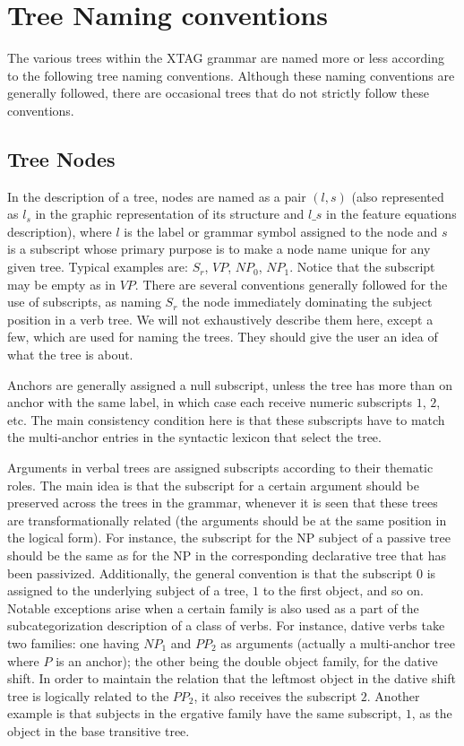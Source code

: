 \chapter{Tree Naming conventions} 
\label{tree-naming} 
 
The various trees within the XTAG grammar are named more or less according to 
the following tree naming conventions.  Although these naming conventions are 
generally followed, there are occasional trees that do not strictly follow 
these conventions. 
 
\section{Tree Nodes} 
In the description of a tree, nodes are named as a pair $(l,s)$ 
(also represented as $l_s$ in the graphic representation of its structure 
and $l\_s$ in the feature equations description), 
where $l$ is the label or grammar symbol assigned to the node and $s$ is a 
subscript whose primary purpose is to make a node name unique for any given 
tree. Typical examples are: $S_r$, $VP$, $NP_0$, $NP_1$. Notice that the 
subscript may be empty as in $VP$. 
There are several conventions generally 
followed for the use of subscripts, as naming $S_r$ the node immediately 
dominating the subject position in a verb tree. 
We will not exhaustively describe them here, 
except a few, which are used for naming the trees. They 
should give the user an idea of what the tree is about. 
 
Anchors are generally assigned a null subscript, unless the tree has more than 
on anchor with the same label, in which case each receive numeric 
subscripts $1$, $2$, etc. The main consistency condition here is that 
these subscripts have to match the multi-anchor entries in the syntactic 
lexicon that select the tree. 
 
Arguments in verbal trees are assigned subscripts according to their 
thematic roles. The main 
idea is that the subscript for a certain argument should be preserved across 
the trees in the grammar, whenever it is seen that these trees are 
transformationally related (the arguments should be at the same position in 
the logical form). 
For instance, the subscript for the NP subject of 
a passive tree should be the same as for the NP in the corresponding 
declarative tree that has been passivized. 
Additionally, the general convention is that the subscript $0$ 
is assigned to the underlying subject of a tree, $1$ to the first object, 
and so on. Notable exceptions arise when a certain family is also used 
as a part of the subcategorization description of a class of verbs. For 
instance, dative verbs take two families: one having $NP_1$ 
and $PP_2$ as arguments (actually a multi-anchor tree where $P$ is an 
anchor); the other being the double object family, for the 
dative shift. In order to maintain the relation that the leftmost object 
in the dative shift tree is logically related to the $PP_2$, it also 
receives the subscript $2$. 
Another example is that 
subjects in the ergative family have the 
same subscript, $1$, as the object in the base transitive tree. 
 
